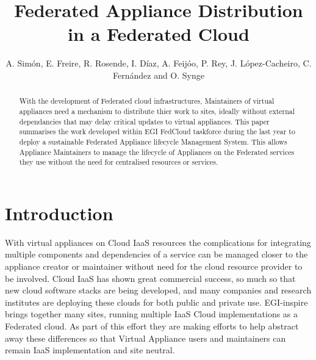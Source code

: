 \documentclass{llncs_Ibergrid2013}
\begin{document}
%
\frontmatter          %
%
\pagestyle{headings}  %
%
\mainmatter              %
%
\title{Federated Appliance Distribution in a Federated Cloud}
%
%
\author{A. Sim\'on, E. Freire, R. Rosende, I. D\'iaz, A. Feij\'oo, P. Rey, J. L\'opez-Cacheiro, C. Fern\'andez and O. Synge}
%
%
%




\maketitle              %

\begin{abstract}
With the development of Federated cloud infrastructures, Maintainers of virtual appliances need a mechanism to distribute thier work to sites, ideally without external dependancies that may delay critical updates to virtual appliances. This paper summarises the work developed within EGI FedCloud taskforce during the last year to deploy a sustainable Federated Appliance lifecycle Management System. This allows Appliance Maintainers to manage the lifecycle of Appliances on the Federated services they use without the need for centralised resources or services.
\end{abstract}

%
\section{Introduction}
\label{sect-introduction}
%
With virtual appliances on Cloud IaaS resources the complications for integrating multiple components and dependencies of a service can be managed closer to the appliance creator or maintainer without need for the cloud resource provider to be involved. Cloud IaaS has shown great commercial success, so much so that new cloud software stacks are being developed, and many companies and research institutes are deploying these clouds for both public and private use. EGI-inspire brings together many sites, running multiple IaaS Cloud implementations as a Federated cloud. As part of this effort they are making efforts to help abstract away these differences so that Virtual Appliance users and maintainers can remain IaaS implementation and site neutral.
\end{document}
